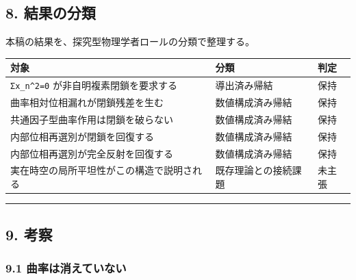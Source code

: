 \documentclass[
  a4paper,
]{article}
\newcounter{none} %
\begin{document}
\subsection{8. 結果の分類}\label{ux7d50ux679cux306eux5206ux985e}

本稿の結果を、探究型物理学者ロールの分類で整理する。

{\def\LTcaptype{none} %
\begin{longtable}[]{@{}
  >{\raggedright\arraybackslash}p{}
  >{\raggedright\arraybackslash}p{}
  >{\raggedright\arraybackslash}p{}@{}}
\toprule\noalign{}
\begin{minipage}[b]{\linewidth}\raggedright
対象
\end{minipage} & \begin{minipage}[b]{\linewidth}\raggedright
分類
\end{minipage} & \begin{minipage}[b]{\linewidth}\raggedright
判定
\end{minipage} \\
\midrule\noalign{}
\endhead
\bottomrule\noalign{}
\endlastfoot
\texttt{Σx\_n\^{}2=0} が非自明複素閉鎖を要求する & 導出済み帰結 &
保持 \\
曲率相対位相漏れが閉鎖残差を生む & 数値構成済み帰結 & 保持 \\
共通因子型曲率作用は閉鎖を破らない & 数値構成済み帰結 & 保持 \\
内部位相再選別が閉鎖を回復する & 数値構成済み帰結 & 保持 \\
内部位相再選別が完全反射を回復する & 数値構成済み帰結 & 保持 \\
実在時空の局所平坦性がこの構造で説明される & 既存理論との接続課題 &
未主張 \\
\end{longtable}
}

\begin{center}\rule{0.5\linewidth}{0.5pt}\end{center}

\subsection{9. 考察}\label{ux8003ux5bdf}

\subsubsection{9.1
曲率は消えていない}\label{ux66f2ux7387ux306fux6d88ux3048ux3066ux3044ux306aux3044}
\end{document}
